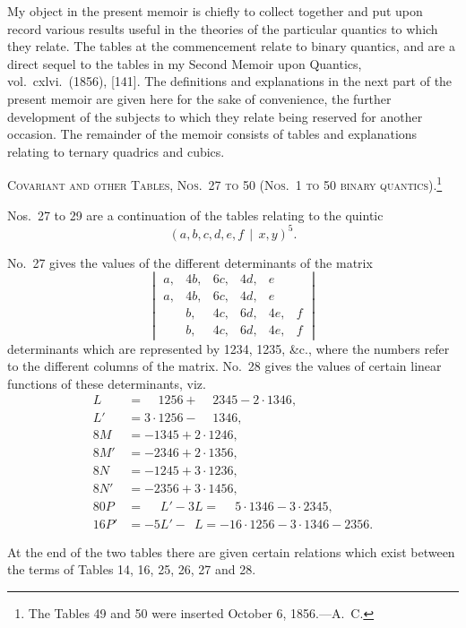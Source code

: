 \documentclass[11pt,a4paper]{book}
\begin{document}
\begin{center}
My object in the present memoir is chiefly to collect together and put upon
record various results useful in the theories of the particular quantics to which
they relate. The tables at the commencement relate to binary quantics, and are a
direct sequel to the tables in my Second Memoir upon Quantics, vol.~cxlvi.~(1856), [141].
The definitions and explanations in the next part of the present memoir are given
here for the sake of convenience, the further development of the subjects to which
they relate being reserved for another occasion. The remainder of the memoir consists
of tables and explanations relating to ternary quadrics and cubics.

\bigskip
\noindent\textsc{Covariant and other Tables, Nos.~27 to 50 (Nos.~1 to 50 binary quantics).}\footnote{The Tables 49 and 50 were inserted October 6, 1856.---A.~C.}

Nos.~27 to 29 are a continuation of the tables relating to the quintic
\[(a, b, c, d, e, f \, \mid\, x, y)^5.\]

No.~27 gives the values of the different determinants of the matrix
\[
\begin{vmatrix}
a, & 4b, & 6c, & 4d, & e \\
a, & 4b, & 6c, & 4d, & e \\
  & b, & 4c, & 6d, & 4e, & f \\
  & b, & 4c, & 6d, & 4e, & f
\end{vmatrix}
\]
determinants which are represented by 1234, 1235, \&c., where the numbers refer to
the different columns of the matrix. No.~28 gives the values of certain linear
functions of these determinants, viz.
\begin{align*}
L &= \phantom{3\cdot}1256 + \phantom{2\cdot}2345 - 2\cdot 1346,\\
L' &= 3\cdot 1256 - \phantom{3\cdot}1346,\\
8M &= -1345 + 2\cdot 1246,\\
8M' &= -2346 + 2\cdot 1356,\\
8N &= -1245 + 3\cdot 1236,\\
8N' &= -2356 + 3\cdot 1456,\\
80P &= \phantom{-5}L' - 3L = \phantom{-}5\cdot 1346 - 3\cdot 2345,\\
16P' &= -5L' - \phantom{3}L = -16\cdot 1256 - 3\cdot 1346 - 2356.
\end{align*}

At the end of the two tables there are given certain relations which exist between
the terms of Tables 14, 16, 25, 26, 27 and 28.


\end{center}
\end{document}
